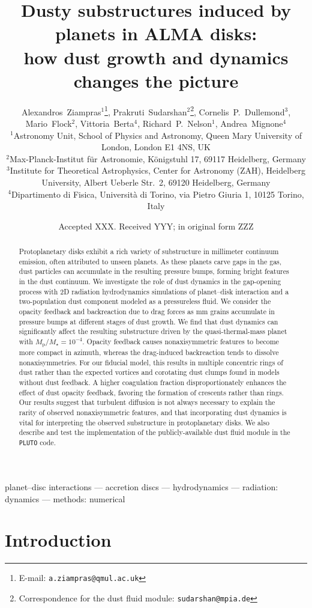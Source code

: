 \documentclass[fleqn,usenatbib,useAMS]{mnras}
\title[Dusty substructures by planets]{Dusty substructures induced by planets in ALMA disks:\\how dust growth and dynamics changes the picture}
\author[A.~Ziampras et al.]{Alexandros~Ziampras$^{1}$\thanks{E-mail: \texttt{a.ziampras@qmul.ac.uk}},
Prakruti~Sudarshan$^{2}$\thanks{Correspondence for the dust fluid module: \texttt{sudarshan@mpia.de}},
Cornelis~P.~Dullemond$^{3}$,
Mario~Flock$^{2}$,
Vittoria~Berta$^{4}$,
\newauthor
Richard~P.~Nelson$^{1}$,
Andrea~Mignone$^{4}$
\\
$^{1}$Astronomy Unit, School of Physics and Astronomy, Queen Mary University of London, London E1 4NS, UK\\
$^{2}$Max-Planck-Institut f{\"u}r Astronomie, K{\"o}nigstuhl 17, 69117 Heidelberg, Germany\\
$^{3}$Institute for Theoretical Astrophysics, Center for Astronomy (ZAH), Heidelberg University, Albert Ueberle Str.~2, 69120 Heidelberg,
Germany\\
$^{4}$Dipartimento di Fisica, Universit{\`a} di Torino, via Pietro Giuria 1, 10125 Torino, Italy\\
}
\date{Accepted XXX. Received YYY; in original form ZZZ}
\newcommand{\Mstar}{M_\star}
\newcommand{\Mp}{M_\mathrm{p}}
\newcommand{\pluto}{\texttt{PLUTO}}
\begin{document}
\label{firstpage}
\pagerange{\pageref{firstpage}--\pageref{lastpage}}
\maketitle

\begin{abstract}
	Protoplanetary disks exhibit a rich variety of substructure in millimeter continuum emission, often attributed to unseen planets. As these planets carve gaps in the gas, dust particles can accumulate in the resulting pressure bumps, forming bright features in the dust continuum. We investigate the role of dust dynamics in the gap-opening process with 2D radiation hydrodynamics simulations of planet--disk interaction and a two-population dust component modeled as a pressureless fluid. We consider the opacity feedback and backreaction due to drag forces as mm grains accumulate in pressure bumps at different stages of dust growth. We find that dust dynamics can significantly affect the resulting substructure driven by the quasi-thermal-mass planet with $\Mp/\Mstar=10^{-4}$. Opacity feedback causes nonaxisymmetric features to become more compact in azimuth, whereas the drag-induced backreaction tends to dissolve nonaxisymmetries. For our fiducial model, this results in multiple concentric rings of dust rather than the expected vortices and corotating dust clumps found in models without dust feedback. A higher coagulation fraction disproportionately enhances the effect of dust opacity feedback, favoring the formation of crescents rather than rings. Our results suggest that turbulent diffusion is not always necessary to explain the rarity of observed nonaxisymmetric features, and that incorporating dust dynamics is vital for interpreting the observed substructure in protoplanetary disks. We also describe and test the implementation of the publicly-available dust fluid module in the \pluto{} code.
\end{abstract}

\begin{keywords}
    planet--disc interactions --- accretion discs --- hydrodynamics --- radiation: dynamics --- methods: numerical
\end{keywords}


\section{Introduction}
\label{sec:introduction}
\end{document}
